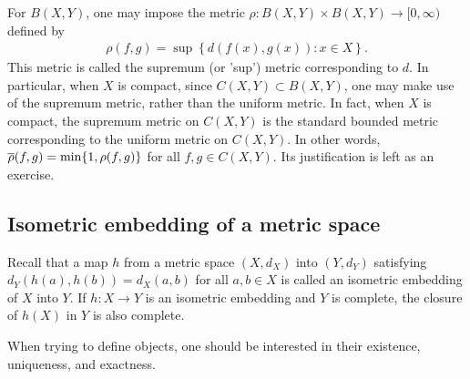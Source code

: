 For $B(X, Y)$, one may impose the metric $\rho: B(X, Y)\times B(X, Y)\rightarrow[0, \infty)$ defined by
\begin{align*}
    \rho(f, g)=\sup\left\{d(f(x), g(x)): x\in X\right\}.
\end{align*}
This metric is called the supremum (or 'sup') metric corresponding to $d$.
In particular, when $X$ is compact, since $C(X, Y)\subset B(X, Y)$, one may make use of the supremum metric, rather than the uniform metric.
In fact, when $X$ is compact, the supremum metric on $C(X, Y)$ is the standard bounded metric corresponding to the uniform metric on $C(X, Y)$.
In other words, $\overline{\rho}(f, g)=\min\{1, \rho(f, g)\}$ for all $f, g\in C(X, Y)$.
\color{brown}Its justification is left as an exercise.\color{black}

\subsection{Isometric embedding of a metric space}

Recall that a map $h$ from a metric space $(X, d_X)$ into $(Y, d_Y)$ satisfying $d_Y(h(a), h(b))=d_X(a, b)$ for all $a, b\in X$ is called an isometric embedding of $X$ into $Y$.
If $h: X\rightarrow Y$ is an isometric embedding and $Y$ is complete, the closure of $h(X)$ in $Y$ is also complete.

When trying to define objects, one should be interested in their existence, uniqueness, and exactness.

